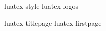 

%

%
%






\environment luatex-style
\environment luatex-logos


\startmode[export]

    \setupbackend
      [export=luatex]

\stopmode

\startdocument
  [status=experimental,
   version=1.08.0]

\startnotmode[*export]
    \component luatex-titlepage
    \component luatex-firstpage
\stopnotmode


